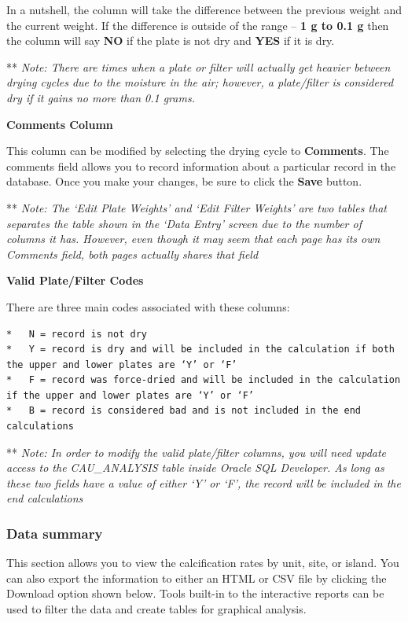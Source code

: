 \documentclass[]{book}
\begin{document}
In a nutshell, the column will take the difference between the previous weight and the current weight. If the difference is outside of the range -- \textbf{1 g to 0.1 g} then the column will say \textbf{NO} if the plate is not dry and \textbf{YES} if it is dry.

** \emph{Note: There are times when a plate or filter will actually get heavier between drying cycles due to the moisture in the air; however, a plate/filter is considered dry if it gains no more than 0.1 grams.}

\textbf{Comments Column}

This column can be modified by selecting the drying cycle to \textbf{Comments}. The comments field allows you to record information about a particular record in the database. Once you make your changes, be sure to click the \textbf{Save} button.

** \emph{Note: The `Edit Plate Weights' and `Edit Filter Weights' are two tables that separates the table shown in the `Data Entry' screen due to the number of columns it has. However, even though it may seem that each page has its own Comments field, both pages actually shares that field}

\textbf{Valid Plate/Filter Codes}

There are three main codes associated with these columns:

\begin{verbatim}
*   N = record is not dry  
*   Y = record is dry and will be included in the calculation if both the upper and lower plates are ‘Y’ or ‘F’  
*   F = record was force-dried and will be included in the calculation if the upper and lower plates are ‘Y’ or ‘F’  
*   B = record is considered bad and is not included in the end calculations  
\end{verbatim}

** \emph{Note: In order to modify the valid plate/filter columns, you will need update access to the CAU\_ANALYSIS table inside Oracle SQL Developer. As long as these two fields have a value of either `Y' or `F', the record will be included in the end calculations}

\hypertarget{data-summary}{%
\subsubsection{Data summary}\label{data-summary}}

This section allows you to view the calcification rates by unit, site, or island. You can also export the information to either an HTML or CSV file by clicking the Download option shown below. Tools built-in to the interactive reports can be used to filter the data and create tables for graphical analysis.
\end{document}
